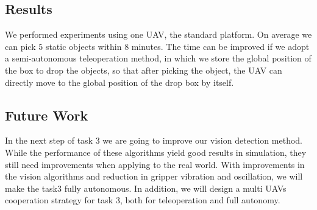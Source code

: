 \documentclass{standalone}
\begin{document}


\subsection{Results}

We performed experiments using one UAV, the standard platform. 
On average we can pick $5$ static objects within $8$ minutes. The time
can be improved if we adopt a 
semi-autonomous teleoperation method, in which we store the global position of
the box to drop the objects, so that after picking the object, the UAV can
directly move to the global position of the drop box by itself.


\subsection{Future Work}
In the next step of task 3 we are going to improve our vision
detection method. While the performance of these algorithms yield good
results in simulation, they still need improvements when applying to
the real world. With improvements in the vision algorithms and reduction
in gripper vibration and oscillation, we will make the task3 fully autonomous. In addition, we will design a multi UAVs cooperation strategy for
task 3, both for teleoperation and full autonomy.
\end{document}
